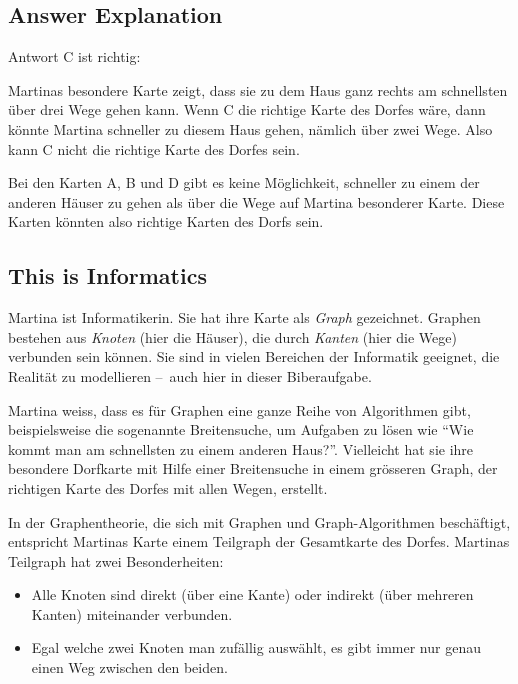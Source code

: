 \documentclass[a4paper,11pt]{report}
\newcommand{\taskGraphicsFolder}{..}
\begin{document}
\endgroup

\subsection*{Answer Explanation}

Antwort C ist richtig: \raisebox{-0.5ex}{}

Martinas besondere Karte zeigt, dass sie zu dem Haus ganz rechts am schnellsten über drei Wege gehen kann. Wenn C die richtige Karte des Dorfes wäre, dann könnte Martina schneller zu diesem Haus gehen, nämlich über zwei Wege. Also kann C nicht die richtige Karte des Dorfes sein.

Bei den Karten A, B und D gibt es keine Möglichkeit, schneller zu einem der anderen Häuser zu gehen als über die Wege auf Martina besonderer Karte. Diese Karten könnten also richtige Karten des Dorfs sein.


\subsection*{This is Informatics}

Martina ist Informatikerin. Sie hat ihre Karte als \emph{Graph} gezeichnet. Graphen bestehen aus \emph{Knoten} (hier die Häuser), die durch \emph{Kanten} (hier die Wege) verbunden sein können. Sie sind in vielen Bereichen der Informatik geeignet, die Realität zu modellieren –~auch hier in dieser Biberaufgabe.

Martina weiss, dass es für Graphen eine ganze Reihe von Algorithmen gibt, beispielsweise die sogenannte Breitensuche, um Aufgaben zu lösen wie \enquote{Wie kommt man am schnellsten zu einem anderen Haus?}. Vielleicht hat sie ihre besondere Dorfkarte mit Hilfe einer Breitensuche in einem grösseren Graph, der richtigen Karte des Dorfes mit allen Wegen, erstellt.

In der Graphentheorie, die sich mit Graphen und Graph-Algorithmen beschäftigt, entspricht Martinas Karte einem Teilgraph der Gesamtkarte des Dorfes. Martinas Teilgraph hat zwei Besonderheiten:

\begin{itemize}
  \item Alle Knoten sind direkt (über eine Kante) oder indirekt (über mehreren Kanten) miteinander verbunden.
  \item Egal welche zwei Knoten man zufällig auswählt, es gibt immer nur genau einen Weg zwischen den beiden.
\end{itemize}
\end{document}
